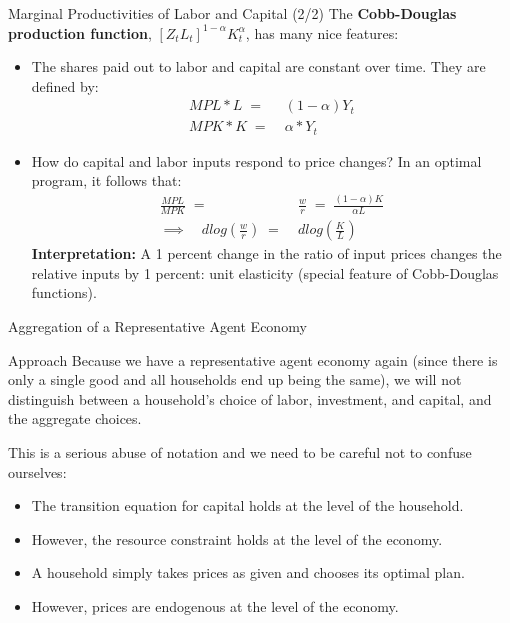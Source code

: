 \documentclass[10pt,c,aspectratio=1610,handout]{beamer}
\begin{document}
\begin{frame}{Marginal Productivities of Labor and Capital (2/2)}%
  The \textbf{Cobb-Douglas production function}, $\left[ Z_{t}L_{t}\right]^{1-\alpha}K_{t}^{\alpha }$, has many nice features:%
  \vspace*{0.15in}%
  \begin{itemize}%
    \item[$\blacktriangleright$] The shares paid out to labor and capital are constant over time. They are defined by:%
    \begin{align*}%
      MPL\ast L \; = & \; (1-\alpha )Y_{t}\\%
      MPK\ast K \; = & \; \alpha \ast Y_{t}%
    \end{align*}%
    \vspace*{0.1in}%
    \pause%
    \item[$\blacktriangleright$] How do capital and labor inputs respond to price changes? In an optimal program, it follows that:%
    \begin{align*}%
      \frac{MPL}{MPK} \; = & \; \frac{w}{r} \; = \; \frac{(1-\alpha )K}{\alpha L}\\%
      \implies \quad d log \left(\frac{w}{r} \right) \; = & \; d log \left( \frac{K}{L} \right)%
    \end{align*}%
    \textbf{Interpretation:} A 1 percent change in the ratio of input prices changes the relative inputs by 1 percent: unit elasticity (special feature of Cobb-Douglas functions).%
  \end{itemize}%
\end{frame}%
\begin{frame}{Aggregation of a Representative Agent Economy}%
  \begin{block}{Approach}%
    Because we have a representative agent economy again (since there is only a single good and all households end up being the same), we will not distinguish between a household's choice of labor, investment, and capital, and the aggregate choices.%
  \end{block}%
  \vspace*{0.2in}%
  \pause%
  This is a serious abuse of notation and we need to be careful not to confuse ourselves:%
  \begin{itemize}%
    \item[$\blacktriangleright$] The transition equation for capital holds at the level of the household.%
    \item[$\blacktriangleright$] However, the resource constraint holds at the level of the economy.%
    \pause%
    \item[$\blacktriangleright$] A household simply takes prices as given and chooses its optimal plan.%
    \item[$\blacktriangleright$] However, prices are endogenous at the level of the economy.%
  \end{itemize}%
\end{frame}%
\end{document}
